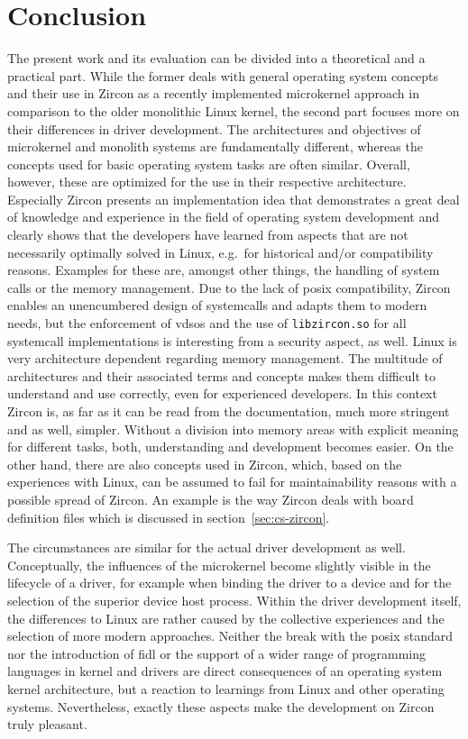 
\chapter{Conclusion}\label{ch:conclusion}
The present work and its evaluation can be divided into a theoretical and a practical part.
While the former deals with general operating system concepts and their use in Zircon as a recently implemented microkernel approach in comparison to the older monolithic Linux kernel, the second part focuses more on their differences in driver development.
The architectures and objectives of microkernel and monolith systems are fundamentally different, whereas the concepts used for basic operating system tasks are often similar.
Overall, however, these are optimized for the use in their respective architecture.
Especially Zircon presents an implementation idea that demonstrates a great deal of knowledge and experience in the field of operating system development and clearly shows that the developers have learned from aspects that are not necessarily optimally solved in Linux, e.g.\ for historical and/or compatibility reasons.
Examples for these are, amongst other things, the handling of system calls or the memory management.
Due to the lack of \ac{posix} compatibility, Zircon enables an unencumbered design of systemcalls and adapts them to modern needs, but the enforcement of \acp{vdso} and the use of \texttt{libzircon.so} for all systemcall implementations is interesting from a security aspect, as well.
Linux is very architecture dependent regarding memory management.
The multitude of architectures and their associated terms and concepts makes them difficult to understand and use correctly, even for experienced developers.
In this context Zircon is, as far as it can be read from the documentation, much more stringent and as well, simpler.
Without a division into memory areas with explicit meaning for different tasks, both, understanding and development becomes easier.
On the other hand, there are also concepts used in Zircon, which, based on the experiences with Linux, can be assumed to fail for maintainability reasons with a possible spread of Zircon.
An example is the way Zircon deals with board definition files which is discussed in section~\ref{sec:cs-zircon}.

The circumstances are similar for the actual driver development as well.
Conceptually, the influences of the microkernel become slightly visible in the lifecycle of a driver, for example when binding the driver to a device and for the selection of the superior device host process.
Within the driver development itself, the differences to Linux are rather caused by the collective experiences and the selection of more modern approaches.
Neither the break with the \ac{posix} standard nor the introduction of \ac{fidl} or the support of a wider range of programming languages in kernel and drivers are direct consequences of an operating system kernel architecture, but a reaction to learnings from Linux and other operating systems.
Nevertheless, exactly these aspects make the development on Zircon truly pleasant.


